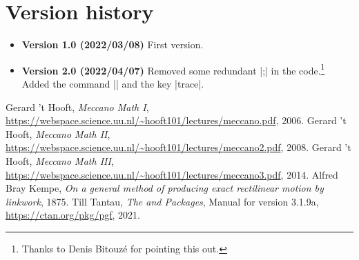\documentclass[a4paper,english,dvipsnames]{ltxdoc}
\begin{document}
\section{Version history}
\begin{itemize}
\item[] \textbf{Version 1.0 (2022/03/08)} First version.
\item[] \textbf{Version 2.0 (2022/04/07)} Removed some redundant |;| in the code.\footnote{Thanks to Denis Bitouz\'e for pointing this out.} Added the command |\liftarmanimate| and the key |trace|.
\end{itemize}
\begin{thebibliography}{9}
Gerard 't Hooft,
\emph{Meccano Math I},\\
\url{https://webspace.science.uu.nl/~hooft101/lectures/meccano.pdf},
2006.
Gerard 't Hooft,
\emph{Meccano Math II},\\
\url{https://webspace.science.uu.nl/~hooft101/lectures/meccano2.pdf},
2008.
Gerard 't Hooft,
\emph{Meccano Math III},\\
\url{https://webspace.science.uu.nl/~hooft101/lectures/meccano3.pdf},
2014.
Alfred Bray Kempe,
\emph{On a general method of producing exact rectilinear motion by linkwork},
1875.
Till Tantau,
\emph{The \tikzname{} and {\upshape\pgfname} Packages},
Manual for version 3.1.9a,
\url{https://ctan.org/pkg/pgf},
2021.
\end{thebibliography}
\printindex
\end{document}
